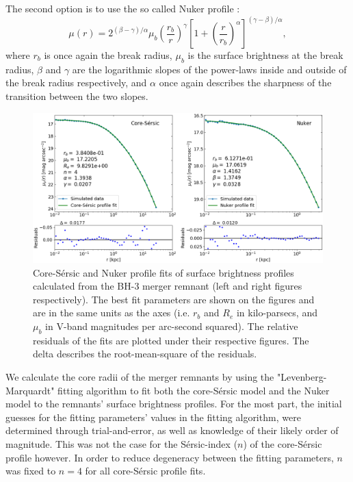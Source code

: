 \documentclass[english, oneside]{HYgradu}
\begin{document}
The second option is to use the so called Nuker profile \citep{Lauer1995}:
\begin{equation}
\mu(r) = 2^{(\beta - \gamma) / \alpha} \mu_b \left( \frac{r_b}{r} \right)^\gamma \left[ 1 + \left( \frac{r}{r_b} \right)^\alpha \right]^{(\gamma - \beta)/\alpha},
\label{eq:nuker}
\end{equation}
where $r_b$ is once again the break radius, $\mu_b$ is the surface brightness at the break radius, $\beta$ and $\gamma$ are the logarithmic slopes of the power-laws inside and outside of the break radius respectively, and $\alpha$ once again describes the sharpness of the transition between the two slopes.

\begin{figure}[h]
	\centering
	\includegraphics[width=\textwidth]{core_nuker_fits.png}
	\caption{Core-Sérsic and Nuker profile fits of surface brightness profiles calculated from the BH-3 merger remnant (left and right figures respectively). The best fit parameters are shown on the figures and are in the same units as the axes (i.e. $r_b$ and $R_e$ in kilo-parsecs, and $\mu_b$ in V-band magnitudes per arc-second squared). The relative residuals of the fits are plotted under their respective figures. The delta describes the root-mean-square of the residuals.}
	\label{figure:core_nuker}
\end{figure}

We calculate the core radii of the merger remnants by using the "Levenberg-Marquardt" fitting algorithm to fit both the core-Sérsic model and the Nuker model to the remnants' surface brightness profiles. For the most part, the initial guesses for the fitting parameters' values in the fitting algorithm, were determined through trial-and-error, as well as knowledge of their likely order of magnitude. This was not the case for the Sérsic-index ($n$) of the core-Sérsic profile however. In order to reduce degeneracy between the fitting parameters, $n$ was fixed to $n=4$ for all core-Sérsic profile fits.
\end{document}
